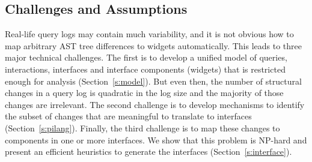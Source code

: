 %
%

\subsection{Challenges and Assumptions}
Real-life query logs may contain much variability, and it is not obvious how to map  arbitrary AST tree differences to widgets automatically. This leads to three major technical challenges.
The first is to develop a unified model of queries, interactions, interfaces and interface components (widgets) that is restricted enough for analysis (Section~\ref{s:model}).
But even then, the number of structural changes in a query log is quadratic in the log size and the majority of those changes are irrelevant. The second challenge is to develop mechanisms to identify the subset of changes that are meaningful to translate to interfaces (Section~\ref{s:pilang}).
Finally, the third challenge is to map these changes to components in one or more interfaces.  We show that this problem is NP-hard and present an efficient heuristics to generate the interfaces (Section~\ref{s:interface}).




